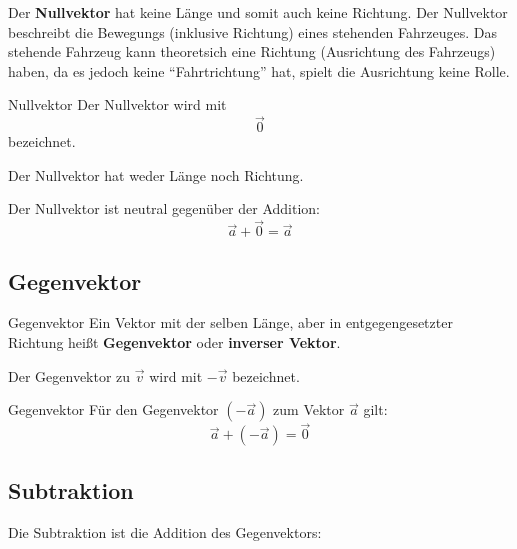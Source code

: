Der \textbf{Nullvektor} hat keine Länge und somit auch keine
Richtung. Der Nullvektor beschreibt \zB die Bewegungs (inklusive
Richtung) eines stehenden Fahrzeuges.
Das stehende Fahrzeug kann theoretsich eine Richtung (Ausrichtung des
Fahrzeugs) haben, da es jedoch keine ``Fahrtrichtung'' hat, spielt die
Ausrichtung keine Rolle.

\begin{definition}{Nullvektor}{}
  Der Nullvektor wird mit
  $$\vec{0}$$
  bezeichnet.

  Der Nullvektor hat weder Länge noch Richtung.
  
\end{definition}

\begin{bemerkung}{}{}
  Der Nullvektor ist neutral gegenüber der Addition:
  $$\vec{a} + \vec{0}  = \vec{a}$$
\end{bemerkung}
\newpage


\subsection{Gegenvektor}

\begin{definition}{Gegenvektor}{}
  Ein Vektor mit der selben Länge, aber in entgegengesetzter Richtung
  heißt \textbf{Gegenvektor} oder \textbf{inverser Vektor}.

  Der Gegenvektor zu $\vec{v}$ wird mit $-\vec{v}$ bezeichnet.
\end{definition}

\begin{bemerkung}{Gegenvektor}{}
  Für den Gegenvektor $(-\vec{a})$ zum Vektor $\vec{a}$ gilt:
  $$\vec{a} + (-\vec{a}) = \vec{0}$$
  
\end{bemerkung}



\newpage


\subsection{Subtraktion}

Die Subtraktion ist die Addition des Gegenvektors:

